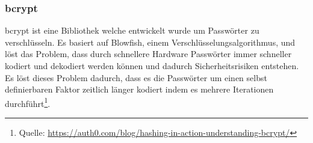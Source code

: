 \subsubsection{bcrypt}
\label{sec:bcrypt}
bcrypt ist eine Bibliothek welche entwickelt wurde um Passwörter zu verschlüsseln. Es basiert auf Blowfish, einem Verschlüsselungsalgorithmus, und löst das Problem, dass durch schnellere Hardware Passwörter immer schneller kodiert und dekodiert werden können und dadurch Sicherheitsrisiken entstehen. Es löst dieses Problem dadurch, dass es die Passwörter um einen selbst definierbaren Faktor zeitlich länger kodiert indem es mehrere Iterationen durchführt\footnote{Quelle: \url{https://auth0.com/blog/hashing-in-action-understanding-bcrypt/}}.
        